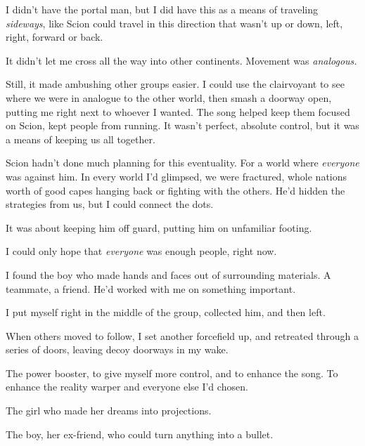 I didn't have the portal man, but I did have this as a means of traveling \emph{sideways}, like Scion could travel in this direction that wasn't up or down, left, right, forward or back.



It didn't let me cross all the way into other continents.  Movement was \emph{analogous.}



Still, it made ambushing other groups easier.  I could use the clairvoyant to see where we were in analogue to the other world, then smash a doorway open, putting me right next to whoever I wanted.  The song helped keep them focused on Scion, kept people from running.  It wasn't perfect, absolute control, but it was a means of keeping us all together.



Scion hadn't done much planning for this eventuality.  For a world where \emph{everyone} was against him.  In every world I'd glimpsed, we were fractured, whole nations worth of good capes hanging back or fighting with the others.  He'd hidden the strategies from us, but I could connect the dots.



It was about keeping him off guard, putting him on unfamiliar footing.



I could only hope that \emph{everyone} was enough people, right now.



I found the boy who made hands and faces out of surrounding materials.  A teammate, a friend.\emph{  }He'd worked with me on something important.



I put myself right in the middle of the group, collected him, and then left.



When others moved to follow, I set another forcefield up, and retreated through a series of doors, leaving decoy doorways in my wake.



The power booster, to give myself more control, and to enhance the song.  To enhance the reality warper and everyone else I'd chosen.



The girl who made her dreams into projections.



The boy, her ex-friend, who could turn anything into a bullet.



